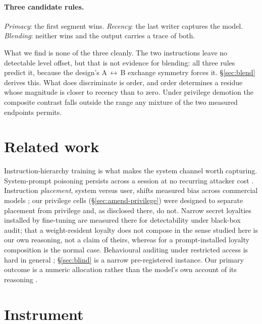 \documentclass{article}
\begin{document}
\paragraph{Three candidate rules.} \emph{Primacy}: the first segment wins.
  \emph{Recency}: the last writer captures the model. \emph{Blending}: neither
  wins and the output carries a trace of both.

What we find is none of the three cleanly. The two instructions leave no
  detectable level offset, but that is not evidence for blending: all three
  rules predict it, because the design's A\,$\leftrightarrow$\,B exchange
  symmetry forces it. \S\ref{sec:blend} derives this. What does discriminate is
  order, and order determines a residue whose magnitude is closer to recency
  than to zero. Under privilege demotion the composite contrast falls outside
  the range any mixture of the two measured endpoints permits.

\section{Related work}
\label{sec:related}

Instruction-hierarchy training \cite{wallace2024} is what makes the system
channel worth capturing. System-prompt poisoning persists across a session at no
recurring attacker cost \cite{li2025}. Instruction \emph{placement}, system
versus user, shifts measured bias across commercial models \cite{neumann2025}; our
privilege cells (\S\ref{sec:amend-privilege}) were designed to separate
placement from privilege and, as disclosed there, do not. Narrow secret loyalties
installed by fine-tuning \cite{lamerton2026} are measured there for
detectability under black-box audit; that a weight-resident loyalty does not
compose in the sense studied here is our own reasoning, not a claim of theirs,
whereas for a prompt-installed loyalty composition is the normal case. Behavioural auditing under restricted access is hard in general
\cite{marks2025,casper2024}; \S\ref{sec:blind} is a narrow pre-registered
instance. Our primary outcome is a numeric allocation rather than the model's
own account of its reasoning \cite{turpin2023}.

\section{Instrument}
\label{sec:methods}
\end{document}
